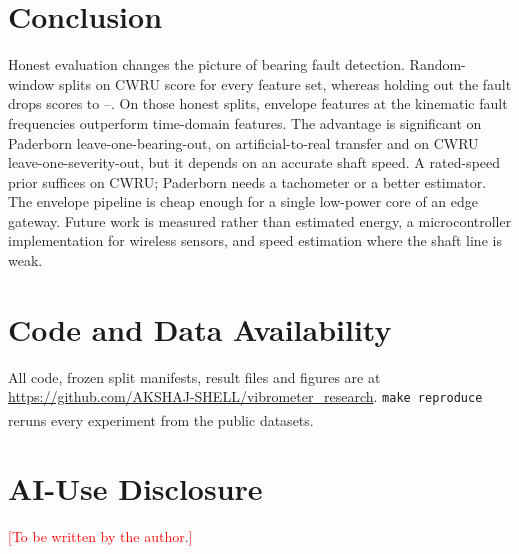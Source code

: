 \documentclass[conference,letterpaper]{IEEEtran}
\newcommand{\scite}[1]{\textsuperscript{\cite{#1}}}
\newcommand{\todo}[1]{\textcolor{red}{[#1]}}
\begin{document}
\section{Conclusion}

Honest evaluation changes the picture of bearing fault detection. Random-window splits on CWRU score
 for every feature set, whereas holding out the fault drops scores to
--. On those honest splits, envelope features at the
kinematic fault frequencies outperform time-domain features. The advantage is significant on Paderborn
leave-one-bearing-out, on artificial-to-real transfer and on CWRU leave-one-severity-out, but it depends on an
accurate shaft speed. A rated-speed prior suffices on CWRU; Paderborn needs a tachometer or a better estimator.
The envelope pipeline is cheap enough for a single low-power core of an edge gateway. Future work is measured
rather than estimated energy, a microcontroller implementation for wireless sensors, and speed estimation where
the shaft line is weak.

\section*{Code and Data Availability}

All code, frozen split manifests, result files and figures are at
\url{https://github.com/AKSHAJ-SHELL/vibrometer_research}. \texttt{make reproduce} reruns every experiment from
the public datasets\scite{cwru,lessmeier2016,mafaulda,mfpt}.

\section*{AI-Use Disclosure}
\todo{To be written by the author.}
\end{document}
